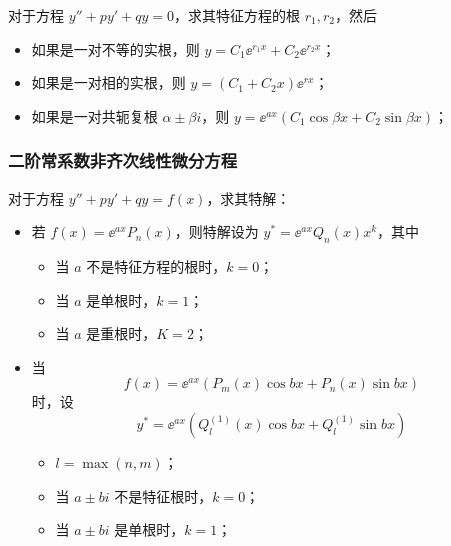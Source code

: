 对于方程 $y'' + py' + qy = 0$，求其特征方程的根 $r_1, r_2$，然后
\begin{itemize}
	\item 如果是一对不等的实根，则 $y = C_1 \ee^{r_1x} + C_2 \ee^{r_2 x}$；
	\item 如果是一对相的实根，则 $y = (C_1 + C_2 x) \ee^{rx}$；
	\item 如果是一对共轭复根 $\alpha \pm \beta i$，则 $y = \ee^{ax} (C_1 \cos \beta x + C_2 \sin \beta x)$；
\end{itemize}

\subsubsection*{二阶常系数非齐次线性微分方程}

对于方程 $y'' + py' + qy = f(x)$，求其特解：

\begin{itemize}
	\item 若 $f(x) = \ee^{a x} P_n(x)$，则特解设为 $y^* = \ee^{ax} Q_n(x) x^k$，其中
	      \begin{itemize}
		      \item 当 $a$ 不是特征方程的根时，$k = 0$；
		      \item 当 $a$ 是单根时，$k = 1$；
		      \item 当 $a$ 是重根时，$K = 2$；
	      \end{itemize}
	\item 当
	      \[ f(x) = \ee^{ax}\left( P_m(x) \cos b x + P_n(x) \sin b x \right) \]
	      时，设
	      \[ y^* = \ee^{ax}\left( Q_l^{(1)}(x) \cos b x + Q_l^{(1)} \sin b x \right) \]
	      \begin{itemize}
		      \item $l = \max(n, m)$；
		      \item 当 $a \pm b i$ 不是特征根时，$k = 0$；
		      \item 当 $a \pm b i$ 是单根时，$k = 1$；
	      \end{itemize}
\end{itemize}
